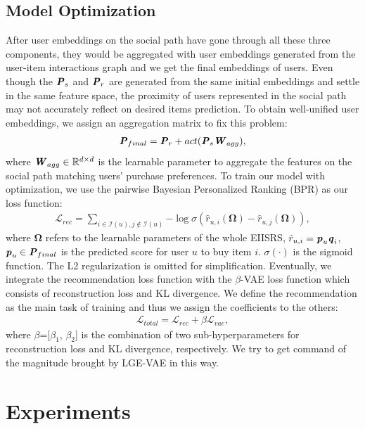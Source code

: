 \documentclass[letterpaper]{article} %
\begin{document}
\subsection{Model Optimization}
After user embeddings on the social path have gone through all these three components, they would be aggregated with user embeddings generated from the user-item interactions graph and we get the final embeddings of users. Even though the $\textbf{\textit{P}}_{s}$ and $\textbf{\textit{P}}_{r}$ are generated from the same initial embeddings and settle in the same feature space, the proximity of users represented in the social path may not accurately reflect on desired items prediction. To obtain well-unified user embeddings, we assign an aggregation matrix to fix this problem:
\begin{align}
    \textbf{\textit{P}}_{final} = \textbf{\textit{P}}_{r} + act(\textbf{\textit{P}}_{s}\textbf{\textit{W}}_{agg}),
\end{align}
where $\textbf{\textit{W}}_{agg} \in \mathbb{R}^{d\times d}$ is the learnable parameter to aggregate the features on the social path matching users’ purchase preferences. To train our model with optimization, we use the pairwise Bayesian Personalized Ranking (BPR) \cite{bpr} as our loss function: 
\begin{align}
    \mathcal{L}_{rec} = \sum_{i\in \mathcal{I}(u), j\notin \mathcal{I}(u)}{-\log \sigma(\hat{r}_{u,i}(\boldsymbol{\Omega})-\hat{r}_{u,j}(\boldsymbol{\Omega}))},
\end{align}
where $\boldsymbol{\Omega}$ refers to the learnable parameters of the whole EIISRS, $\hat{r}_{u,i}=\textbf{\textit{p}}_u \textbf{\textit{q}}_i$, $\textbf{\textit{p}}_u \in \textbf{\textit{P}}_{final}$ is the predicted score for user $u$ to buy item $i$. $\sigma(\cdot)$ is the sigmoid function. The L2 regularization is omitted for simplification. Eventually, we integrate the recommendation loss function with the $\beta$-VAE loss function which consists of reconstruction loss and KL divergence. We define the recommendation as the main task of training and thus we assign the coefficients to the others:
\begin{align}
    \mathcal{L}_{total} = \mathcal{L}_{rec} + \beta\mathcal{L}_{vae},
\end{align}
where $\beta$=[$\beta_1$, $\beta_2$] is the combination of two sub-hyperparameters for reconstruction loss and KL divergence, respectively. We try to get command of the magnitude brought by LGE-VAE in this way.

\section{Experiments}
\end{document}
